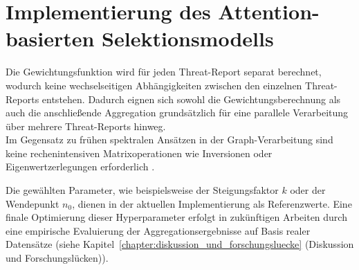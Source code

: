 \section{Implementierung des Attention-basierten Selektionsmodells}
\label{sec:implementierung_des_attention_basierten_selektionsmodells}

Die Gewichtungsfunktion wird für jeden Threat-Report separat berechnet, wodurch keine wechselseitigen Abhängigkeiten zwischen den einzelnen Threat-Reports entstehen. Dadurch eignen sich sowohl die Gewichtungsberechnung als auch die anschließende Aggregation grundsätzlich für eine parallele Verarbeitung über mehrere Threat-Reports hinweg.\\
Im Gegensatz zu frühen spektralen Ansätzen in der Graph-Verarbeitung sind keine rechenintensiven Matrixoperationen wie Inversionen oder Eigenwertzerlegungen erforderlich \cite{velickovic2018gat}.

Die gewählten Parameter, wie beispielsweise der Steigungsfaktor $k$ oder der Wendepunkt $n_0$, dienen in der aktuellen Implementierung als Referenzwerte. Eine finale Optimierung dieser Hyperparameter erfolgt in zukünftigen Arbeiten durch eine empirische Evaluierung der Aggregationsergebnisse auf Basis realer Datensätze (siehe Kapitel~\ref{chapter:diskussion_und_forschungsluecke} (Diskussion und Forschungslücken)).

